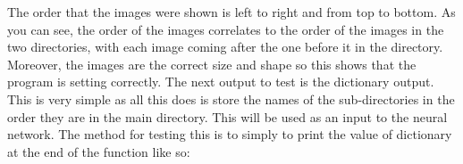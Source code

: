 \documentclass{report}
\begin{document}
\begin{figure}[H]
    \centering
\end{figure}
\noindent The order that the images were shown is left to right and from top to bottom. As you can see, the order of the images correlates to the order of the images in the two directories, with each image coming after the one before it in the directory. Moreover, the images are the correct size and shape so this shows that the program is setting  correctly.
\newline
The next output to test is the dictionary output. This is very simple as all this does is store the names of the sub-directories in the order they are in the main directory. This will be used as an input to the neural network. The method for testing this is to simply to print the value of dictionary at the end of the function like so:
\end{document}
